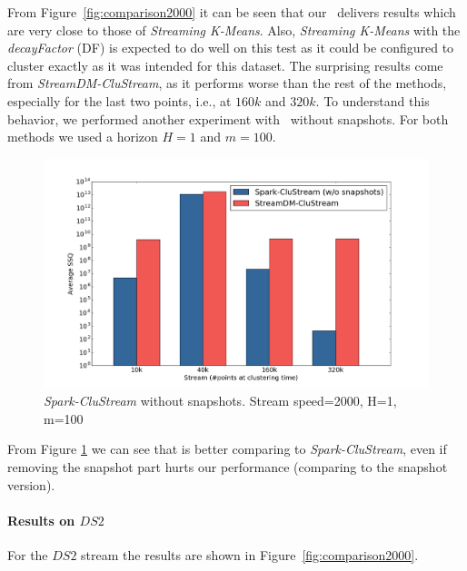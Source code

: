 From Figure~\ref{fig:comparison2000} it can be seen that our \our~delivers results which are very close to those of \textit{Streaming K-Means}. Also, \textit{Streaming K-Means} with the \textit{decayFactor} (DF) is expected to do well on this test as it could be configured to cluster exactly as it was intended for this dataset. 
The surprising results come from \textit{StreamDM-CluStream}, as it performs worse than the rest of the methods, especially for the last two points, i.e.,  at $160k$ and $320k$.
To understand this behavior, we performed another experiment with \our~without snapshots. For both methods we used a horizon $H = 1$ and $m=100$.
\begin{figure}[h]
 \centering
 \includegraphics[scale=0.24]{./styles/comparisonNoSnaps.png}
 \caption{\textit{Spark-CluStream} without snapshots. Stream speed=2000, H=1, m=100}
 \label{fig:comparisonNoSnaps}
\end{figure}
From Figure \ref{fig:comparisonNoSnaps} we can see that \our is better comparing to \textit{Spark-CluStream}, even if removing the snapshot part hurts our performance (comparing to the snapshot version).

\paragraph{Results on $DS2$}
For the $DS2$ stream the results are shown in Figure~\ref{fig:comparison2000}.

